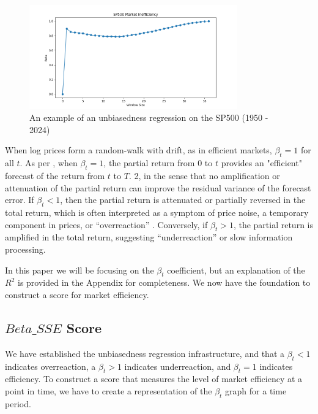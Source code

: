 \begin{figure}[h!]
    \centering
    \includegraphics[width=0.8\textwidth]{../figs/SP500 Market Inefficiency.png}
    \caption{An example of an unbiasedness regression on the SP500 (1950 - 2024)}
    \label{fig:sp_500_unbiasedness}
\end{figure}

When log prices form a random-walk with drift, as in efficient markets, $\beta_t = 1$ for all $t$. 
As per \citet{mincer_zarnowitz_1969}, when $\beta_t = 1$, the partial return from $0$ to $t$ provides an "efficient" forecast of the return
from $t$ to $T$. 2, in the sense that no amplification or attenuation of the partial return can improve the residual variance
of the forecast error. If $\beta_t < 1$, then the partial return is attenuated or partially reversed in the total return, which is often interpreted as a symptom of price noise,
a temporary component in prices, or “overreaction” \citep{barclay_hendershott_2003}. Conversely, if $\beta_t > 1$, the partial return is amplified in the total return, suggesting “underreaction” or slow information processing.

In this paper we will be focusing on the $\beta_t$ coefficient, but an explanation of the $R^2$ is provided in the Appendix for completeness. 
We now have the foundation to construct a score for market efficiency.

\subsection{$Beta\_SSE$ Score}

We have established the unbiasedness regression infrastructure, and that a $\beta_t < 1$ indicates overreaction, a $\beta_t > 1$ indicates underreaction, and $\beta_t = 1$ indicates efficiency.
To construct a score that measures the level of market efficiency at a point in time, we have to create a representation of the $\beta_t$ graph for a time period.

